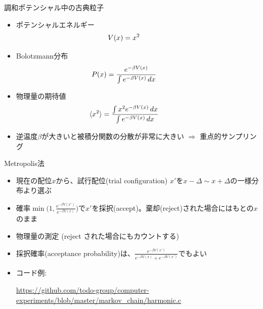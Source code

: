 \documentclass[dvipdfmx]{beamer}
\begin{document}
\begin{frame}[t,fragile]{調和ポテンシャル中の古典粒子}
  \begin{itemize}
    \setlength{\itemsep}{1em}
  \item ポテンシャルエネルギー
    \[ \hspace*{-4em} V(x) = x^2 \]
  \item Bolotzmann分布
    \[ \hspace*{-4em} P(x) = \frac{e^{-\beta V(x)}}{\int e^{-\beta V(x)} \, dx} \]
  \item 物理量の期待値
    \[ \hspace*{-4em} \langle x^2 \rangle = \frac{\int x^2 e^{-\beta V(x)} \, dx}{\int e^{-\beta V(x)} \, dx} \]
  \item 逆温度$\beta$が大きいと被積分関数の分散が非常に大きい $\Rightarrow$ 重点的サンプリング
  \end{itemize}
  \vspace*{-16em} \hfill
\end{frame}

\begin{frame}[t,fragile]{Metropolis法}
  \begin{itemize}
    \setlength{\itemsep}{1em}
  \item 現在の配位$x$から、試行配位(trial configuration) $x'$を$x - \Delta \sim x + \Delta$の一様分布より選ぶ
  \item 確率$\min \Big( 1, \frac{e^{-\beta V(x')}}{e^{-\beta V(x)}} \Big)$で$x'$を採択(accept)。棄却(reject)された場合にはもとの$x$のまま
  \item 物理量の測定 (reject された場合にもカウントする)
  \item 採択確率(acceptance probability)は、$\frac{e^{-\beta V(x')}}{e^{-\beta V(x)}+e^{-\beta V(x')}}$でもよい
  \item コード例:

    {\tiny \url{https://github.com/todo-group/computer-experiments/blob/master/markov_chain/harmonic.c}}
  \end{itemize}
\end{frame}
\end{document}

